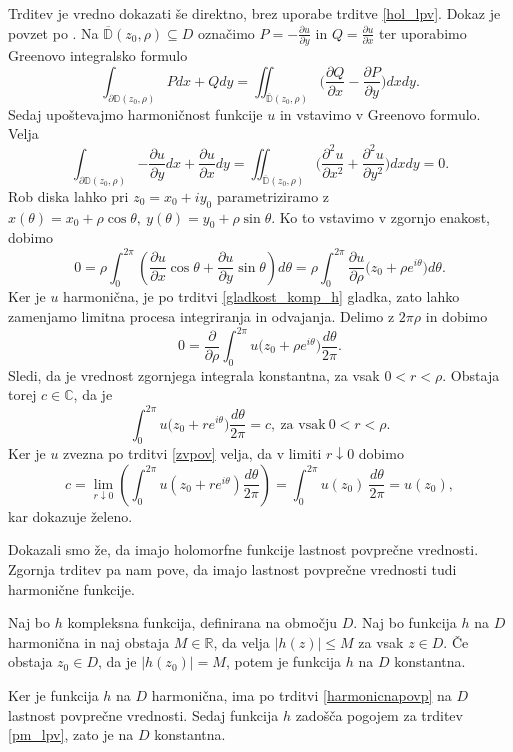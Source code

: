 \documentclass[mat1, tisk]{fmfdelo}
\begin{document}
\begin{dokaz}
        Trditev je vredno dokazati še direktno, brez uporabe trditve \ref{hol_lpv}. Dokaz je povzet po \cite[stran 85 in 86]{gamelin}.
        Na $\overline{\mathbb{D}}(z_0, \rho) \subseteq D$ označimo $P = -\frac{\partial u}{\partial y}$ in $Q = \frac{\partial u}{\partial x}$ ter uporabimo Greenovo integralsko formulo
        $$
            \int_{\partial \mathbb{D}(z_0, \rho)}{P dx + Q dy} = \iint_{\overline{\mathbb{D}}(z_0, \rho)}{\bigg(\frac{\partial Q}{\partial x} - \frac{\partial P}{\partial y}\bigg)dx dy}.
        $$ 
        Sedaj upoštevajmo harmoničnost funkcije $u$ in vstavimo v Greenovo formulo. Velja
        $$
        \int_{\partial \mathbb{D}(z_0, \rho)}{-\frac{\partial u}{\partial y} dx + \frac{\partial u}{\partial x} dy} = \iint_{\overline{\mathbb{D}}(z_0, \rho)}{\bigg(\frac{\partial^2 u}{\partial x^2} + \frac{\partial^2 u}{\partial y^2}\bigg)dx dy} = 0. 
        $$
        Rob diska lahko pri $z_0 = x_0 + iy_0$ parametriziramo z $x(\theta) = x_0 + \rho \cos\theta,~y(\theta) = y_0 + \rho \sin\theta$. Ko to vstavimo v zgornjo enakost, dobimo
        $$
        0 = \rho \int_{0}^{2 \pi}{\left(\frac{\partial u}{\partial x} \cos\theta + \frac{\partial u}{\partial y} \sin\theta\right) d\theta} = \rho \int_{0}^{2\pi}{\frac{\partial u}{\partial \rho}\big(z_0 + \rho e^{i\theta}\big)d\theta}.
        $$
        Ker je $u$ harmonična, je po trditvi \ref{gladkost_komp_h} gladka, zato lahko zamenjamo limitna procesa integriranja in odvajanja. Delimo z $2\pi \rho$ in dobimo
        $$
        0 = \frac{\partial}{\partial \rho} \int_{0}^{2\pi}{u\big(z_0 + \rho e^{i\theta}\big)\frac{d\theta}{2 \pi}}.
        $$
        Sledi, da je vrednost zgornjega integrala konstantna, za vsak $0 <r < \rho$. Obstaja torej $c \in \mathbb{C}$, da je
        $$
        \int_{0}^{2\pi}{u\big(z_0 + r e^{i\theta}\big)\frac{d\theta}{2 \pi}} = c,~\text{za vsak}~ 0 < r < \rho.
        $$
        Ker je $u$ zvezna po trditvi \ref{zvpov} velja, da v limiti $r \downarrow 0$ dobimo
        $$
        c = \lim_{r \downarrow 0}{\left(\int_{0}^{2\pi}{u\left(z_0 + r e^{i\theta}\right)\frac{d\theta}{2 \pi}}\right)} = \int_{0}^{2\pi}{{u(z_0)~\frac{d\theta}{2 \pi}}} = u(z_0),
        $$
        kar dokazuje želeno.
    \end{dokaz}

    Dokazali smo že, da imajo holomorfne funkcije lastnost povprečne vrednosti. Zgornja trditev pa nam pove, da imajo lastnost povprečne vrednosti tudi harmonične funkcije.

    \begin{posledica}
        \label{pm_harm}
        Naj bo $h$ kompleksna funkcija, definirana na območju $D$. Naj bo funkcija $h$ na $D$ harmonična in naj obstaja $M \in \mathbb{R}$, da velja $|h(z)| \leq M$ za vsak $z \in D$. 
        Če obstaja $z_0 \in D$, da je $|h(z_0)| = M$, potem je funkcija $h$ na $D$ konstantna.  
    \end{posledica}
    \begin{dokaz}
        Ker je funkcija $h$ na $D$ harmonična, ima po trditvi \ref{harmonicnapovp} na $D$ lastnost povprečne vrednosti. Sedaj funkcija $h$ zadošča pogojem za trditev \ref{pm_lpv}, zato je na $D$ konstantna.
    \end{dokaz}
\end{document}
